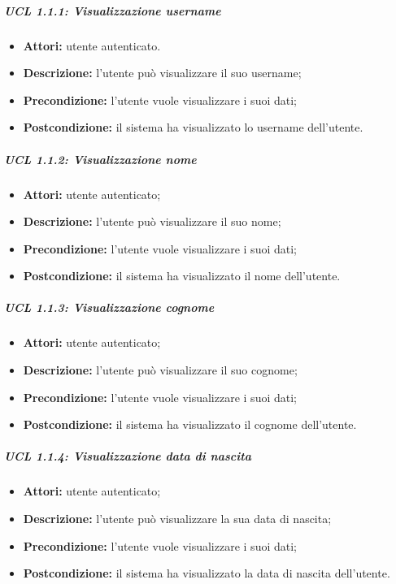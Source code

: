 \subparagraph{UCL 1.1.1: Visualizzazione username}
\begin{itemize}
	\item \textbf{Attori:} utente autenticato.
	\item \textbf{Descrizione:} l'utente può visualizzare il suo username;
	\item \textbf{Precondizione:} l'utente vuole visualizzare i suoi dati;
\item \textbf{Postcondizione:} il sistema ha visualizzato lo username dell'utente.
\end{itemize}

\subparagraph{UCL 1.1.2: Visualizzazione nome}
\begin{itemize}
	\item \textbf{Attori:} utente autenticato;
	\item \textbf{Descrizione:} l'utente può visualizzare il suo nome;
	\item \textbf{Precondizione:} l'utente vuole visualizzare i suoi dati;
	\item \textbf{Postcondizione:} il sistema ha visualizzato il nome dell'utente.
\end{itemize}

\subparagraph{UCL 1.1.3: Visualizzazione cognome}
\begin{itemize}
	\item \textbf{Attori:} utente autenticato;
	\item \textbf{Descrizione:} l'utente può visualizzare il suo cognome;
	\item \textbf{Precondizione:} l'utente vuole visualizzare i suoi dati;
	\item \textbf{Postcondizione:} il sistema ha visualizzato il cognome dell'utente.
\end{itemize}

\subparagraph{UCL 1.1.4: Visualizzazione data di nascita}
\begin{itemize}
	\item \textbf{Attori:} utente autenticato;
	\item \textbf{Descrizione:} l'utente può visualizzare la sua data di nascita;
	\item \textbf{Precondizione:} l'utente vuole visualizzare i suoi dati;
	\item \textbf{Postcondizione:} il sistema ha visualizzato la data di nascita dell'utente.
\end{itemize}

